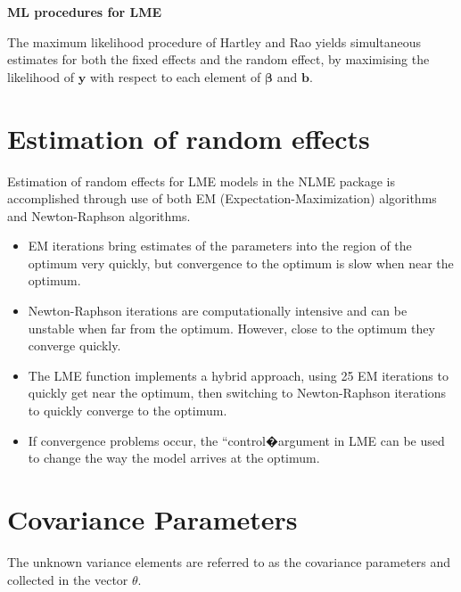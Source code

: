 \documentclass[12pt, a4paper]{report}
\theoremstyle{plain}
\theoremstyle{definition}
\theoremstyle{remark}
\begin{document}
	
	\noindent \textbf{ML procedures for LME}
	
	The maximum likelihood procedure of Hartley and Rao yields
	simultaneous estimates for both the fixed effects and the random
	effect, by maximising the likelihood of $\boldsymbol{y}$ with
	respect to each element of $\boldsymbol{\beta}$ and
	$\boldsymbol{b}$.
	
	
	\section{Estimation of random effects}
	
	Estimation of random effects for LME models in the NLME package is accomplished through use
	of both EM (Expectation-Maximization) algorithms and Newton-Raphson algorithms.
	\begin{itemize}
		\item EM iterations bring estimates of the parameters into the region of the optimum very quickly, but
		convergence to the optimum is slow when near the optimum.
		\item Newton-Raphson iterations are computationally intensive and can be unstable when far from the
		optimum. However, close to the optimum they converge quickly.
		\item The LME function implements a hybrid approach, using 25 EM iterations to quickly get near the
		optimum, then switching to Newton-Raphson iterations to quickly converge to the optimum. \item If
		convergence problems occur, the ``control�argument in LME can be used to change the way the
		model arrives at the optimum.
	\end{itemize}
	
	
	
	
	
	\section{Covariance Parameters} %
	The unknown variance elements are referred to as the covariance parameters and collected in the vector $\theta$.
	
\end{document}
